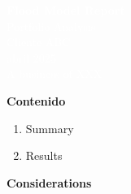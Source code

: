 \documentclass[
]{article}
\author{}
\date{\vspace{-2.5em}2025-04-16}
\begin{document}
\thispagestyle{empty}


\vspace*{6cm}

\begin{flushleft}
  {\fontsize{38}{45}\selectfont \textbf{\textcolor{white}{Flood Model Report}}} \\[0.8cm]
  {\fontsize{24}{30}\selectfont \textcolor{white}{Portfolio Analysis}} \\[1.2cm]
  {\fontsize{24}{30}\selectfont \textcolor{white}{Cliente ABC}} \\[0.4cm]
  {\Large \textcolor{white}{abril 2025}} \\[4cm]
  {\small \textcolor{white}{A business of XXX}}
\end{flushleft}

\noindent \textbf{\textcolor{turquesa}{\fontsize{16}{20}\selectfont Contenido}}

\noindent

\begin{enumerate}
  \item {\fontsize{11}{13}\selectfont Summary \dotfill \pageref{sec:summary}}
  \item {\fontsize{11}{13}\selectfont Results \dotfill \pageref{sec:results}}
\end{enumerate}

\newpage

\noindent \textbf{\textcolor{turquesa}{\fontsize{16}{20}\selectfont Considerations}}
\vspace{0.5cm}
\end{document}
